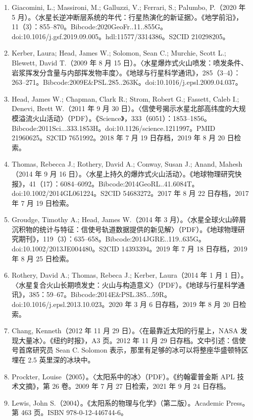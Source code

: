 \begin{enumerate}
    \item Giacomini, L.; Massironi, M.; Galluzzi, V.; Ferrari, S.; Palumbo, P.（2020 年 5 月）。〈水星长逆冲断层系统的年代：行星热演化的新证据〉。《地学前沿》，11（3）：855–870。Bibcode:2020GeoFr..11..855G。doi:10.1016/j.gsf.2019.09.005。hdl:11577/3314386。S2CID 210298205。
    \item Kerber, Laura; Head, James W.; Solomon, Sean C.; Murchie, Scott L.; Blewett, David T.（2009 年 8 月 15 日）。〈水星爆炸式火山喷发：喷发条件、岩浆挥发分含量与内部挥发物丰度〉。《地球与行星科学通讯》，285（3–4）：263–271。Bibcode:2009E&PSL.285..263K。doi:10.1016/j.epsl.2009.04.037。
    \item Head, James W.; Chapman, Clark R.; Strom, Robert G.; Fassett, Caleb I.; Denevi, Brett W.（2011 年 9 月 30 日）。〈信使号揭示水星北部高纬度的大规模溢流火山活动〉（PDF）。《Science》，333（6051）：1853–1856。Bibcode:2011Sci...333.1853H。doi:10.1126/science.1211997。PMID 21960625。S2CID 7651992。2018 年 7 月 19 日存档，2019 年 8 月 20 日检索。
    \item Thomas, Rebecca J.; Rothery, David A.; Conway, Susan J.; Anand, Mahesh（2014 年 9 月 16 日）。〈水星上持久的爆炸式火山活动〉。《地球物理研究快报》，41（17）：6084–6092。Bibcode:2014GeoRL..41.6084T。doi:10.1002/2014GL061224。S2CID 54683272。2017 年 8 月 22 日存档，2017 年 7 月 19 日检索。
    \item Groudge, Timothy A.; Head, James W.（2014 年 3 月）。〈水星全球火山碎屑沉积物的统计与特征：信使号轨道数据提供的新见解〉（PDF）。《地球物理研究期刊》，119（3）：635–658。Bibcode:2014JGRE..119..635G。doi:10.1002/2013JE004480。S2CID 14393394。2019 年 7 月 18 日存档，2019 年 8 月 25 日检索。
    \item Rothery, David A.; Thomas, Rebeca J.; Kerber, Laura（2014 年 1 月 1 日）。〈水星复合火山长期喷发史：火山与构造意义〉（PDF）。《地球与行星科学通讯》，385：59–67。Bibcode:2014E&PSL.385...59R。doi:10.1016/j.epsl.2013.10.023。2020 年 3 月 6 日存档，2019 年 8 月 20 日检索。
    \item Chang, Kenneth（2012 年 11 月 29 日）。〈在最靠近太阳的行星上，NASA 发现大量冰〉。《纽约时报》，A3 页。2012 年 11 月 29 日存档。文中引述：信使号首席研究员 Sean C. Solomon 表示，那里有足够的冰可以将整座华盛顿特区埋在 2.5 英里深的冰块中。
    \item Prockter, Louise（2005）。〈太阳系中的冰〉（PDF）。《约翰霍普金斯 APL 技术文摘》，第 26 卷。2009 年 7 月 27 日检索，2021 年 9 月 24 日存档。
    \item Lewis, John S.（2004）。《太阳系的物理与化学》（第二版）。Academic Press。第 463 页。ISBN 978-0-12-446744-6。

\end{enumerate}
